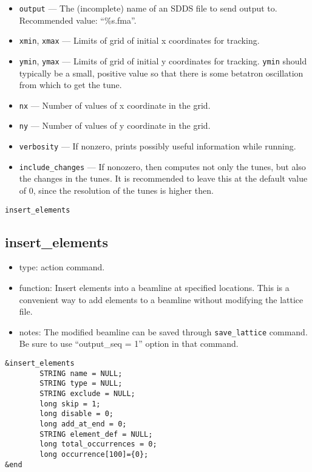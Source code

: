\documentclass[11pt]{article}
\begin{document}
\begin{itemize}
\item \verb|output| --- The (incomplete) name of an SDDS file to send output to.  
 Recommended value: ``\%s.fma''.
\item \verb|xmin|, \verb|xmax| --- Limits of grid of initial x coordinates for tracking.             
\item \verb|ymin|, \verb|ymax| --- Limits of grid of initial y coordinates for tracking.             
 \verb|ymin| should typically be a small, positive value so that there                               
 is some betatron oscillation from which to get the tune.                       
\item \verb|nx| --- Number of values of x coordinate in the grid.
\item \verb|ny| --- Number of values of y coordinate in the grid.
\item \verb|verbosity| --- If nonzero, prints possibly useful information while running.
\item \verb|include_changes| --- If nonozero, then computes not only the tunes, but also
        the changes in the tunes.  It is recommended to leave this at the default value of
        0, since the resolution of the tunes is higher then.
\end{itemize}

\begin{latexonly}
\newpage
\begin{center}{\Large\verb|insert_elements|}\end{center}
\end{latexonly}
\subsection{insert\_elements \label{subsec:insertelements}}

\begin{itemize}
\item type: action command.
\item function: Insert elements into a beamline at specified locations. This is a convenient way to
 add elements to a beamline without modifying the lattice file.
\item notes: 
	The modified beamline can be saved through \verb|save_lattice|
   command. Be sure to use ``output\_seq = 1'' option in that command.  
\end{itemize}

\begin{verbatim}
&insert_elements
        STRING name = NULL;
        STRING type = NULL;
        STRING exclude = NULL;
        long skip = 1;
        long disable = 0;
        long add_at_end = 0;
        STRING element_def = NULL;
        long total_occurrences = 0;
        long occurrence[100]={0};
&end
\end{verbatim}
\end{document}

